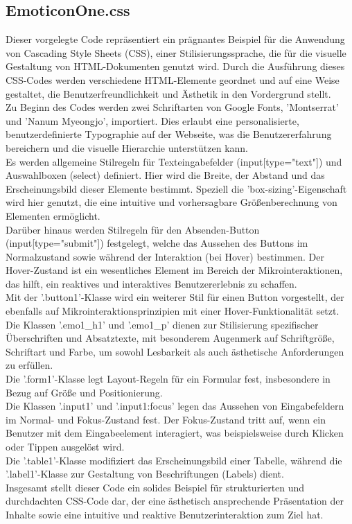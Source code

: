 \documentclass[./dokumentation.tex]{subfiles}
\begin{document}
\subsection{EmoticonOne.css}
Dieser vorgelegte Code repräsentiert ein prägnantes Beispiel für die Anwendung von Cascading Style Sheets (CSS), einer Stilisierungssprache, die für die visuelle Gestaltung von HTML-Dokumenten genutzt wird. Durch die Ausführung dieses CSS-Codes werden verschiedene HTML-Elemente geordnet und auf eine Weise gestaltet, die Benutzerfreundlichkeit und Ästhetik in den Vordergrund stellt.\\
Zu Beginn des Codes werden zwei Schriftarten von Google Fonts, 'Montserrat' und 'Nanum Myeongjo', importiert. Dies erlaubt eine personalisierte, benutzerdefinierte Typographie auf der Webseite, was die Benutzererfahrung bereichern und die visuelle Hierarchie unterstützen kann.\\
Es werden allgemeine Stilregeln für Texteingabefelder (input[type="text"]) und Auswahlboxen (select) definiert. Hier wird die Breite, der Abstand und das Erscheinungsbild dieser Elemente bestimmt. Speziell die 'box-sizing'-Eigenschaft wird hier genutzt, die eine intuitive und vorhersagbare Größenberechnung von Elementen ermöglicht.\\
Darüber hinaus werden Stilregeln für den Absenden-Button (input[type="submit"]) festgelegt, welche das Aussehen des Buttons im Normalzustand sowie während der Interaktion (bei Hover) bestimmen. Der Hover-Zustand ist ein wesentliches Element im Bereich der Mikrointeraktionen, das hilft, ein reaktives und interaktives Benutzererlebnis zu schaffen.\\
Mit der '.button1'-Klasse wird ein weiterer Stil für einen Button vorgestellt, der ebenfalls auf Mikrointeraktionsprinzipien mit einer Hover-Funktionalität setzt.\\
Die Klassen '.emo1\_h1' und '.emo1\_p' dienen zur Stilisierung spezifischer Überschriften und Absatztexte, mit besonderem Augenmerk auf Schriftgröße, Schriftart und Farbe, um sowohl Lesbarkeit als auch ästhetische Anforderungen zu erfüllen.\\
Die '.form1'-Klasse legt Layout-Regeln für ein Formular fest, insbesondere in Bezug auf Größe und Positionierung.\\
Die Klassen '.input1' und '.input1:focus' legen das Aussehen von Eingabefeldern im Normal- und Fokus-Zustand fest. Der Fokus-Zustand tritt auf, wenn ein Benutzer mit dem Eingabeelement interagiert, was beispielsweise durch Klicken oder Tippen ausgelöst wird. \\
Die '.table1'-Klasse modifiziert das Erscheinungsbild einer Tabelle, während die '.label1'-Klasse zur Gestaltung von Beschriftungen (Labels) dient.\\
Insgesamt stellt dieser Code ein solides Beispiel für strukturierten und durchdachten CSS-Code dar, der eine ästhetisch ansprechende Präsentation der Inhalte sowie eine intuitive und reaktive Benutzerinteraktion zum Ziel hat.
\end{document}
